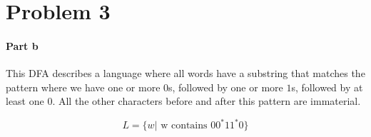 \documentclass{article}
\begin{document}
\section{Problem 3}

\paragraph{Part b}

This DFA describes a language where all words have a substring that matches the pattern where we have one or more $0$s, followed by
one or more $1$s, followed by at least one $0$. All the other characters before and after this pattern are immaterial.

\begin{equation*}
    L = \{ w | \textrm{ w contains } 00^\ast11^\ast0 \}
\end{equation*}
\end{document}
